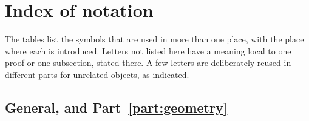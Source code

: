 \section{Index of notation}
\label{app:notation}

The tables list the symbols that are used in more than one place,
with the place where each is introduced. Letters not listed here have
a meaning local to one proof or one subsection, stated there. A few
letters are deliberately reused in different parts for unrelated
objects, as indicated.

\renewcommand{\arraystretch}{1.12}\setlength{\tabcolsep}{4pt}\raggedbottom

\subsection*{General, and Part~\ref{part:geometry}}

